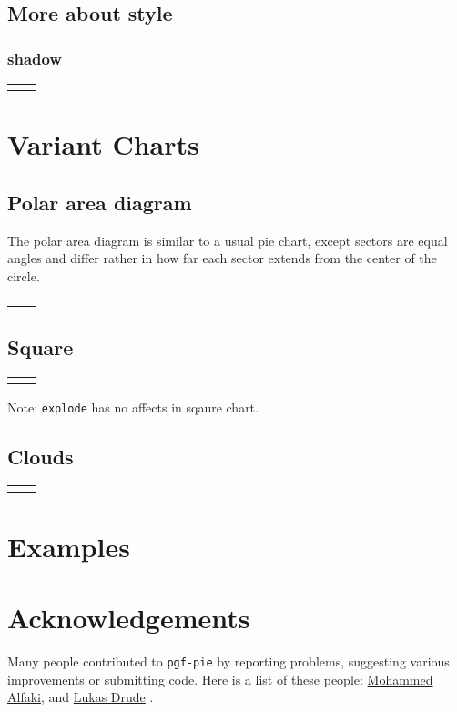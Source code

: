 \documentclass{article}
\newcommand{\demo}[2][1]{
  \begin{center}
  \begin{tabular}{cc}
    \begin{minipage}{.49\linewidth}
      \centering
      \resizebox{#1\linewidth}{!}{
        
      }
    \end{minipage}
    &
    \begin{minipage}{.45\linewidth}
      
    \end{minipage}
  \end{tabular}
  \end{center}
}
\newcommand{\example}[2][1]{
  \begin{center}  
    \resizebox{#1\linewidth}{!}{
      
    }
  \end{center}
  
}
\begin{document}
\subsection{More about style}
\subsubsection{shadow}
\demo[0.6]{shadow}

\section{Variant Charts}
\subsection{Polar area diagram}
The polar area diagram is similar to a usual pie chart, except sectors
are equal angles and differ rather in how far each sector extends from
the center of the circle.

\demo[0.6]{polar}

\subsection{Square}

\demo[0.6]{square}

Note: \texttt{explode} has no affects in sqaure chart.

\subsection{Clouds}

\demo[0.6]{cloud}

\section{Examples}


\section{Acknowledgements}
Many people contributed to \texttt{pgf-pie} by reporting problems,
suggesting various improvements or submitting code. Here is a list of
these people:
\href{mailto:mohammed.alfaki@ii.uib.no}{Mohammed Alfaki},
and
\href{mailto:ldrude@mail.uni-paderborn.de}{Lukas Drude}
.
                                              
\end{document}
